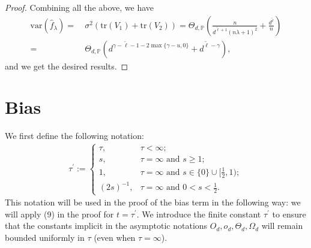 \documentclass{article}
\theoremstyle{plain}
\theoremstyle{definition}
\theoremstyle{remark}
\newcommand{\green}{\color{green}}
\newcommand{\dhnote}[1]{{\color{red}[#1]} } %
\begin{document}
\begin{appendix}
\begin{proof}









Combining all the above, we have
\begin{equation*}
    \begin{aligned}
      \mathrm{var}\left( \hat{f}_{\lambda} \right) =&~ \sigma^2 \left(\mathrm{tr}(V_1) + \mathrm{tr} \left( V_{2} \right) \right)
        =
        \Theta_{d, \mathbb{P}}\left(\frac{n}{d^{\tilde{\ell}+1}(n\lambda+1)^2} + \frac{d^{\tilde{\ell}}}{n}\right)\\
        = &~
        \Theta_{d, \mathbb{P}}\left(
        d^{\gamma - \tilde{\ell} - 1 - 2  \max\{\gamma - u, 0\}}
+ d^{\tilde{\ell} - \gamma}
\right),
    \end{aligned}
\end{equation*}
and we get the desired results.
\end{proof}





\section{Bias}\label{append_bias}


We first define the following notation:
\begin{equation}\label{eqn_def_of_tau_prime}
    \begin{aligned}
  \tau^{\prime} :=
  \begin{cases}
\tau, &  \tau < \infty;\\
s, &  \tau = \infty \text{ and } s \geq 1;\\
1, &  \tau = \infty \text{ and } s \in \{0\} \cup [\frac{1}{2}, 1);\\
(2s)^{-1}, &  \tau = \infty \text{ and } 0 < s < \frac{1}{2}.
  \end{cases}
  \end{aligned}
\end{equation}
This notation will be used in the proof of the bias term in the following way: we will apply (9) in the proof for $t=\tau^{\prime}$. 
We introduce the finite constant $\tau^{\prime}$ to ensure that 
    the constants implicit in the asymptotic notations $O_d, o_d, \Theta_d, \Omega_d$ will remain bounded uniformly in $\tau$ (even when $\tau = \infty$).


\end{appendix}
\end{document}
